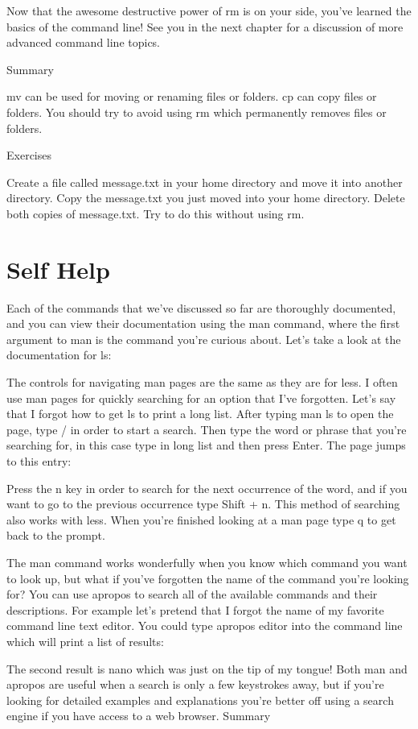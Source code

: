 Now that the awesome destructive power of rm is on your side, you’ve learned the basics of the command line! See you in the next chapter for a discussion of more advanced command line topics.


Summary

mv can be used for moving or renaming files or folders.
cp can copy files or folders.
You should try to avoid using rm which permanently removes files or folders.

Exercises

Create a file called message.txt in your home directory and move it into another directory.
Copy the message.txt you just moved into your home directory.
Delete both copies of message.txt. Try to do this without using rm.


\section{Self Help}

Each of the commands that we’ve discussed so far are thoroughly documented, and you can view their documentation using the man command, where the first argument to man is the command you’re curious about. Let’s take a look at the documentation for ls:

The controls for navigating man pages are the same as they are for less. I often use man pages for quickly searching for an option that I’ve forgotten. Let’s say that I forgot how to get ls to print a long list. After typing man ls to open the page, type / in order to start a search. Then type the word or phrase that you’re searching for, in this case type in long list and then press Enter. The page jumps to this entry:

Press the n key in order to search for the next occurrence of the word, and if you want to go to the previous occurrence type Shift + n. This method of searching also works with less. When you’re finished looking at a man page type q to get back to the prompt.

The man command works wonderfully when you know which command you want to look up, but what if you’ve forgotten the name of the command you’re looking for? You can use apropos to search all of the available commands and their descriptions. For example let’s pretend that I forgot the name of my favorite command line text editor. You could type apropos editor into the command line which will print a list of results:

The second result is nano which was just on the tip of my tongue! Both man and apropos are useful when a search is only a few keystrokes away, but if you’re looking for detailed examples and explanations you’re better off using a search engine if you have access to a web browser.
Summary


